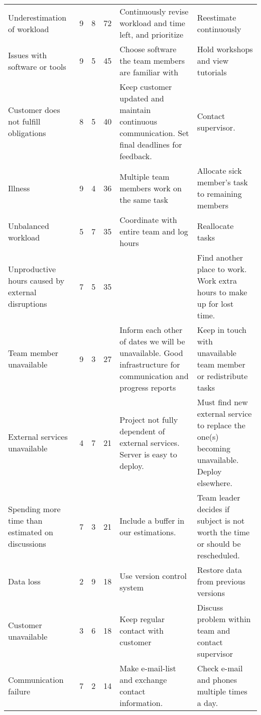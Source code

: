\begin{longtable}{|p{3.6cm}!{\vrule width -1pt}l!{\vrule width -1pt}l!{\vrule width -1pt}l!{\vrule width -1pt}p{4.8cm}!{\vrule width -1pt}p{4.8cm}|}
\hline
Underestimation of workload & 9 & 8 & 72 & Continuously revise workload and time left, and prioritize & Reestimate continuously\\
Issues with software or tools & 9 & 5 & 45 & Choose software the team members are familiar with & Hold workshops and view tutorials\\
Customer does not fulfill obligations & 8 & 5 & 40 & Keep customer updated and maintain continuous communication. Set final deadlines for feedback. & Contact supervisor.\\
Illness & 9 & 4 & 36 & Multiple team members work on the same task& Allocate sick member's task to remaining members\\
Unbalanced workload & 5 & 7 & 35 & Coordinate with entire team and log hours & Reallocate tasks\\
Unproductive hours caused by external disruptions & 7 & 5 & 35 & & Find another place to work. Work extra hours to make up for lost time. \\
Team member unavailable & 9 & 3 & 27 & Inform each other of dates we will be unavailable. Good infrastructure for communication and progress reports & Keep in touch with unavailable team member or redistribute tasks\\
External services unavailable & 4 & 7 & 21 & Project not fully dependent of external services. Server is easy to deploy. & Must find new external service to replace the one(s) becoming unavailable. Deploy elsewhere.\\
Spending more time than estimated on discussions & 7 & 3& 21& Include a buffer in our estimations. & Team leader decides if subject is not worth the time or should be rescheduled.\\
Data loss & 2 & 9 & 18 & Use version control system &Restore data from previous versions\\
Customer unavailable & 3 & 6 & 18 & Keep regular contact with customer & Discuss problem within team and contact supervisor\\
Communication failure & 7 & 2 & 14 & Make e-mail-list and exchange contact information. %
 & Check e-mail and phones multiple times a day.\\

\end{longtable}
